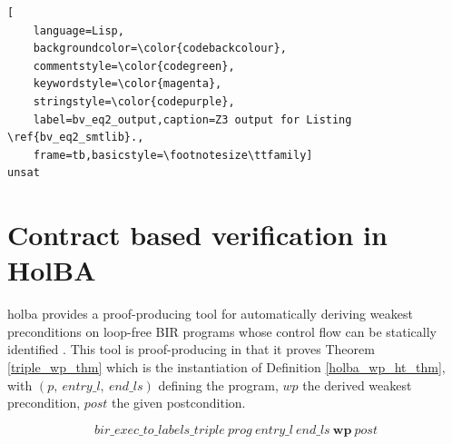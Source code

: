 \documentclass{kththesis}
\begin{document}
\begin{lstlisting}[
    language=Lisp,
    backgroundcolor=\color{codebackcolour},
    commentstyle=\color{codegreen},
    keywordstyle=\color{magenta},
    stringstyle=\color{codepurple},
    label=bv_eq2_output,caption=Z3 output for Listing \ref{bv_eq2_smtlib}.,
    frame=tb,basicstyle=\footnotesize\ttfamily]
unsat
\end{lstlisting}

\section{Contract based verification in HolBA} \label{contract-verif-holba}

\gls{holba} provides a \gls{proof-producing} tool for automatically deriving weakest preconditions on loop-free \gls{BIR} programs whose control flow can be statically identified \cite{lindner_trabin:_2019}. This tool is proof-producing in that it proves Theorem \ref{triple_wp_thm} which is the instantiation of Definition \ref{holba_wp_ht_thm}, with $(p,~entry\_l,~end\_ls)$ defining the program, $wp$ the derived weakest precondition, $post$ the given postcondition.

\begin{equation}
    bir\_exec\_to\_labels\_triple~prog~entry\_l~end\_ls~\mathbf{wp}~post
    \label{triple_wp_thm}
\end{equation}
\end{document}
